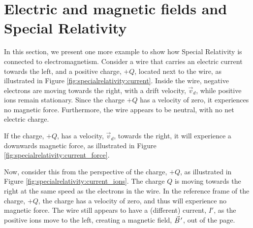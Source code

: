 \section{Electric and magnetic fields and Special Relativity}
In this section, we present one more example to show how Special Relativity is connected to electromagnetism. Consider a wire that carries an electric current towards the left, and a positive charge, $+Q$, located next to the wire, as illustrated in Figure \ref{fig:specialrelativity:current}.
Inside the wire, negative electrons are moving towards the right, with a drift velocity, $\vec v_d$, while positive ions remain stationary. Since the charge $+Q$ has a velocity of zero, it experiences no magnetic force. Furthermore, the wire appears to be neutral, with no net electric charge.

If the charge, $+Q$, has a velocity, $\vec v_d$, towards the right, it will experience a downwards magnetic force, as illustrated in Figure \ref{fig:specialrelativity:current_force}.

Now, consider this from the perspective of the charge, $+Q$, as illustrated in Figure \ref{fig:specialrelativity:current_ions}. The charge $Q$ is moving towards the right at the same speed as the electrons in the wire. In the reference frame of the charge, $+Q$, the charge has a velocity of zero, and thus will experience no magnetic force. The wire still appears to have a (different) current, $I'$, as the positive ions move to the left, creating a magnetic field, $\pvec B'$, out of the page.

